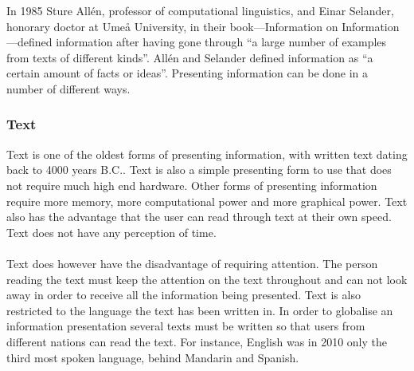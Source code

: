 In 1985 Sture All{\'e}n, professor of computational linguistics, and Einar Selander, honorary doctor at Ume{\aa} University, in their book---Information on Information---defined information after having gone through ``a large number of examples from texts of different kinds''. All{\'e}n and Selander defined information as ``a certain amount of facts or ideas''.\cite{informationDef1} Presenting information can be done in a number of different ways.

\subsubsection{Text}
Text is one of the oldest forms of presenting information, with written text dating back to 4000 years B.C..\cite{cuneiform} Text is also a simple presenting form to use that does not require much high end hardware. Other forms of presenting information require more memory, more computational power and more graphical power. Text also has the advantage that the user can read through text at their own speed. Text does not have any perception of time.
\\
\\
Text does however have the disadvantage of requiring attention. The person reading the text must keep the attention on the text throughout and can not look away in order to receive all the information being presented. Text is also restricted to the language the text has been written in. In order to globalise an information presentation several texts must be written so that users from different nations can read the text. For instance, English was in 2010 only the third most spoken language, behind Mandarin and Spanish.\cite{sprakNe}


